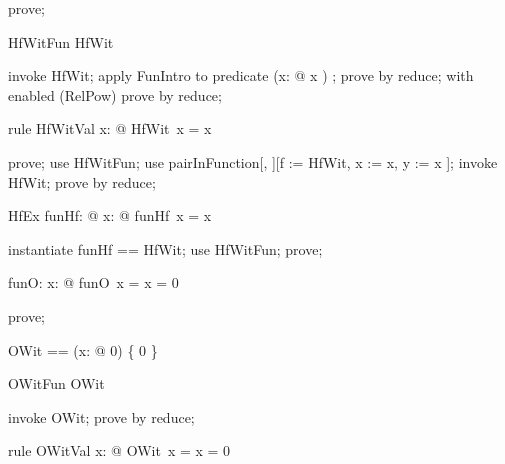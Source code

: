 \documentclass{article}
\begin{document}
\begin{zproof}
prove;
\end{zproof}

\begin{theorem}{HfWitFun}
  HfWit \in \nat \fun \nat
\end{theorem}

\begin{zproof}
invoke HfWit;
apply FunIntro to predicate (\lambda x: \nat @ x ) \in \nat \fun \nat;
prove by reduce;
with enabled (RelPow) prove by reduce;
\end{zproof}

\begin{theorem}{rule HfWitVal}
  \forall x: \nat @ HfWit~x = x 
\end{theorem}

\begin{zproof}
prove;
use HfWitFun;
use pairInFunction[\nat, \nat][f := HfWit, x := x, y := x ];
invoke HfWit;
prove by reduce;
\end{zproof}

\begin{theorem}{HfEx}
  \exists funHf: \nat \fun \nat @ \forall x: \nat @ funHf~x = x 
\end{theorem}

\begin{zproof}
instantiate funHf == HfWit;
use HfWitFun;
prove;
\end{zproof}

\begin{axdef}
  funO: \nat \fun \nat
\where
   \forall x: \nat @ funO~x = \IF x = 0  
\end{axdef}

\begin{zproof}
prove;
\end{zproof}

\begin{zed}
  OWit == (\lambda x: \nat @ 0) \oplus \{ 0  \}
\end{zed}

\begin{theorem}{OWitFun}
  OWit \in \nat \fun \nat
\end{theorem}

\begin{zproof}
invoke OWit;
prove by reduce;
\end{zproof}

\begin{theorem}{rule OWitVal}
  \forall x: \nat @ OWit~x = \IF x = 0  
\end{theorem}
\end{document}
